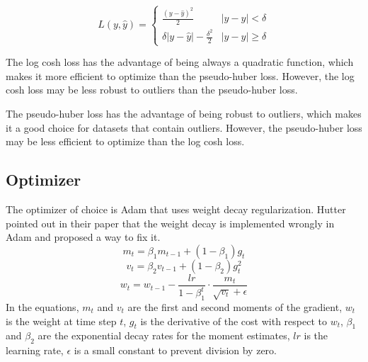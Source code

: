 \begin{equation}
L(y, \hat{y}) = \begin{cases}
    \frac{(y - \hat{y})^2}{2} & |y - \hat{y}| < \delta \\
    \delta |y - \hat{y}| - \frac{\delta^2}{2} & |y - \hat{y}| \ge \delta
    \end{cases}
\end{equation}

The log cosh loss has the advantage of being always a quadratic function, which makes it more efficient to optimize than the pseudo-huber loss. However, the log cosh loss may be less robust to outliers than the pseudo-huber loss.

The pseudo-huber loss has the advantage of being robust to outliers, which makes it a good choice for datasets that contain outliers. However, the pseudo-huber loss may be less efficient to optimize than the log cosh loss.

\subsection{Optimizer}
\label{subsec:optimizer}

The optimizer of choice is Adam \cite{kingma2017adam} that uses weight decay regularization.
Hutter pointed out in their paper \cite{loshchilov2019decoupled} that the weight decay is implemented wrongly in Adam and proposed a way to fix it.
\begin{equation}
\label{eq:first_moment}
m_t = \beta_1 m_{t-1} + (1 - \beta_1) g_t
\end{equation}
\begin{equation}
\label{eq:second_moment}
v_t = \beta_2 v_{t-1} + (1 - \beta_2) g_t^2
\end{equation}
\begin{equation}
\label{eq:weight_update}
w_t = w_{t-1} - \frac{lr}{1 - \beta_1^t} \cdot \frac{m_t}{\sqrt{v_t} + \epsilon}
\end{equation}
In the equations, $m_t$ and $v_t$ are the first and second moments of the gradient, $w_t$ is the weight at time step $t$, $g_t$ is the derivative of the cost with respect to $w_t$, $\beta_1$ and $\beta_2$ are the exponential decay rates for the moment estimates, $lr$ is the learning rate, $\epsilon$ is a small constant to prevent division by zero.